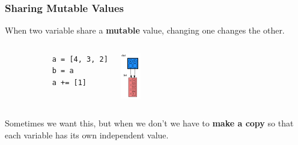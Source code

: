 \documentclass[10pt, colorlinks=true, urlcolor=blue]{beamer}
\begin{document}
\begin{frame}[fragile]
  \frametitle {Sharing Mutable Values}
  When two variable share a \textbf{mutable} value, changing one changes the other.
  \vspace{1em}
\begin{columns}
  \begin{verbatim}
           a = [4, 3, 2]
           b = a
           a += [1]
    \end{verbatim}
    \begin{center}\includegraphics[width=0.25\textwidth]{figures/sharing.png}\end{center}
\end{columns}
\vspace{1em}
Sometimes we want this, but when we don't we have to \textbf{make a copy} so that each variable has its own independent value.
\end{frame}
\end{document}
